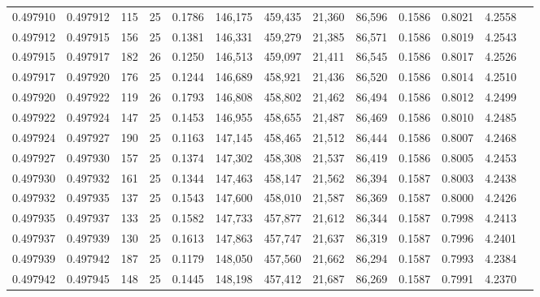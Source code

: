 \begin{tabular}{rrrrrrrrrrrrr}
0.497910 & 0.497912 & 115 &  25 &                                     0.1786 & 146,175 & 459,435 &  21,360 &  86,596 & 0.1586 & 0.8021 & 4.2558 \\
0.497912 & 0.497915 & 156 &  25 &                                     0.1381 & 146,331 & 459,279 &  21,385 &  86,571 & 0.1586 & 0.8019 & 4.2543 \\
0.497915 & 0.497917 & 182 &  26 &                                     0.1250 & 146,513 & 459,097 &  21,411 &  86,545 & 0.1586 & 0.8017 & 4.2526 \\
0.497917 & 0.497920 & 176 &  25 &                                     0.1244 & 146,689 & 458,921 &  21,436 &  86,520 & 0.1586 & 0.8014 & 4.2510 \\
0.497920 & 0.497922 & 119 &  26 &                                     0.1793 & 146,808 & 458,802 &  21,462 &  86,494 & 0.1586 & 0.8012 & 4.2499 \\
0.497922 & 0.497924 & 147 &  25 &                                     0.1453 & 146,955 & 458,655 &  21,487 &  86,469 & 0.1586 & 0.8010 & 4.2485 \\
0.497924 & 0.497927 & 190 &  25 &                                     0.1163 & 147,145 & 458,465 &  21,512 &  86,444 & 0.1586 & 0.8007 & 4.2468 \\
0.497927 & 0.497930 & 157 &  25 &                                     0.1374 & 147,302 & 458,308 &  21,537 &  86,419 & 0.1586 & 0.8005 & 4.2453 \\
0.497930 & 0.497932 & 161 &  25 &                                     0.1344 & 147,463 & 458,147 &  21,562 &  86,394 & 0.1587 & 0.8003 & 4.2438 \\
0.497932 & 0.497935 & 137 &  25 &                                     0.1543 & 147,600 & 458,010 &  21,587 &  86,369 & 0.1587 & 0.8000 & 4.2426 \\
0.497935 & 0.497937 & 133 &  25 &                                     0.1582 & 147,733 & 457,877 &  21,612 &  86,344 & 0.1587 & 0.7998 & 4.2413 \\
0.497937 & 0.497939 & 130 &  25 &                                     0.1613 & 147,863 & 457,747 &  21,637 &  86,319 & 0.1587 & 0.7996 & 4.2401 \\
0.497939 & 0.497942 & 187 &  25 &                                     0.1179 & 148,050 & 457,560 &  21,662 &  86,294 & 0.1587 & 0.7993 & 4.2384 \\
0.497942 & 0.497945 & 148 &  25 &                                     0.1445 & 148,198 & 457,412 &  21,687 &  86,269 & 0.1587 & 0.7991 & 4.2370 \\

\end{tabular}

